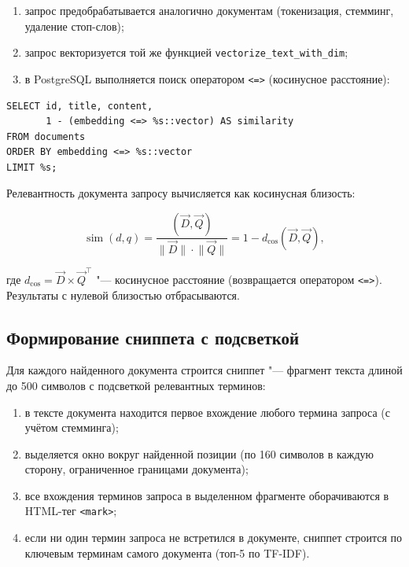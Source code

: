 \begin{enumerate}
	\item запрос предобрабатывается аналогично документам (токенизация, стемминг,
	      удаление стоп-слов);
	\item запрос векторизуется той же функцией \texttt{vectorize\_text\_with\_dim};
	\item в PostgreSQL выполняется поиск оператором \texttt{<=>} (косинусное расстояние):
\end{enumerate}

\begin{lstlisting}[caption={Запрос векторного поиска в БД.},label={lst:vector_search}]
SELECT id, title, content,
       1 - (embedding <=> %s::vector) AS similarity
FROM documents
ORDER BY embedding <=> %s::vector
LIMIT %s;
\end{lstlisting}

Релевантность документа запросу вычисляется как косинусная близость:

\begin{equation}
	\operatorname{sim}(d, q) = \frac{(\vec{D}, \vec{Q})}{\lVert \vec{D} \rVert \cdot \lVert \vec{Q} \rVert}
	= 1 - d_{\cos}(\vec{D}, \vec{Q}),
	\label{eq:cosine_full}
\end{equation}

где $d_{\cos} = \vec{D} \times \vec{Q}^{\top}$ "--- косинусное расстояние
(возвращается оператором \texttt{<=>}). Результаты с нулевой близостью
отбрасываются.

\subsection{Формирование сниппета с подсветкой}

Для каждого найденного документа строится сниппет "--- фрагмент текста длиной
до 500 символов с подсветкой релевантных терминов:

\begin{enumerate}
	\item в тексте документа находится первое вхождение любого термина запроса
	      (с учётом стемминга);
	\item выделяется окно вокруг найденной позиции (по 160 символов в каждую
	      сторону, ограниченное границами документа);
	\item все вхождения терминов запроса в выделенном фрагменте оборачиваются
	      в HTML-тег \texttt{<mark>};
	\item если ни один термин запроса не встретился в документе, сниппет строится
	      по ключевым терминам самого документа (топ-5 по TF-IDF).
\end{enumerate}

